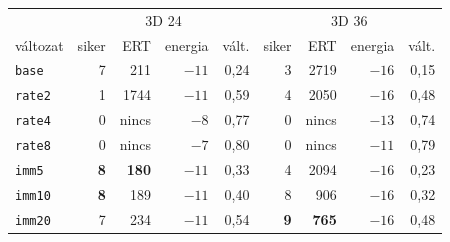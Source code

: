 \begin{tabular}{lrrrrrrrr}
\hline
& \multicolumn{4}{c}{3D 24} & \multicolumn{4}{c}{3D 36} \\
változat & siker & ERT & energia & vált. & siker & ERT & energia & vált. \\
\hline
\texttt{base} & 7 & 211 & \textbf{$-11$} & 0,24 & 3 & 2719 & \textbf{$-16$} & 0,15 \\
\texttt{rate2} & 1 & 1744 & \textbf{$-11$} & 0,59 & 4 & 2050 & \textbf{$-16$} & 0,48 \\
\texttt{rate4} & 0 & nincs & $-8$ & 0,77 & 0 & nincs & $-13$ & 0,74 \\
\texttt{rate8} & 0 & nincs & $-7$ & 0,80 & 0 & nincs & $-11$ & 0,79 \\
\texttt{imm5} & \textbf{8} & \textbf{180} & \textbf{$-11$} & 0,33 & 4 & 2094 & \textbf{$-16$} & 0,23 \\
\texttt{imm10} & \textbf{8} & 189 & \textbf{$-11$} & 0,40 & 8 & 906 & \textbf{$-16$} & 0,32 \\
\texttt{imm20} & 7 & 234 & \textbf{$-11$} & 0,54 & \textbf{9} & \textbf{765} & \textbf{$-16$} & 0,48 \\
\hline
\end{tabular}
